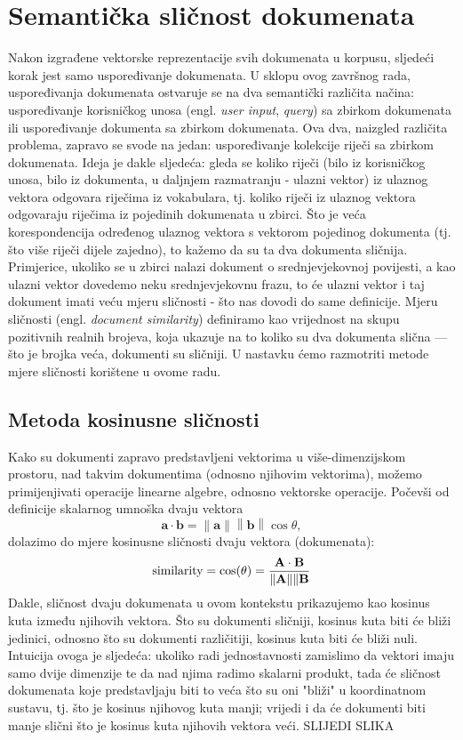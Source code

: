 \documentclass[times, utf8, zavrsni]{fer}
\begin{document}
\section{Semantička sličnost dokumenata}
Nakon izgrađene vektorske reprezentacije svih dokumenata u korpusu, sljedeći korak jest samo uspoređivanje dokumenata. U sklopu ovog završnog rada, uspoređivanja dokumenata ostvaruje se na dva semantički različita načina: uspoređivanje korisničkog unosa (engl. \textit{user input}, \textit{query}) sa zbirkom dokumenata ili uspoređivanje dokumenta sa zbirkom dokumenata.
Ova dva, naizgled različita problema, zapravo se svode na jedan: uspoređivanje kolekcije riječi sa zbirkom dokumenata. Ideja je dakle sljedeća: gleda se koliko riječi (bilo iz korisničkog unosa, bilo iz dokumenta, u daljnjem razmatranju - ulazni vektor) iz ulaznog vektora odgovara riječima iz vokabulara, tj. koliko riječi iz ulaznog vektora odgovaraju riječima iz pojedinih dokumenata u zbirci. Što je veća korespondencija određenog ulaznog vektora s vektorom pojedinog dokumenta (tj. što više riječi dijele zajedno), to kažemo da su ta dva dokumenta sličnija. Primjerice, ukoliko se u zbirci nalazi dokument o srednjevjekovnoj povijesti, a kao ulazni vektor dovedemo neku srednjevjekovnu frazu, to će ulazni vektor i taj dokument imati veću mjeru sličnosti - što nas dovodi do same definicije.
Mjeru sličnosti (engl. \textit{document similarity}) definiramo kao vrijednost na skupu pozitivnih realnih brojeva, koja ukazuje na to koliko su dva dokumenta slična — što je brojka veća, dokumenti su sličniji.
U nastavku ćemo razmotriti metode mjere sličnosti korištene u ovome radu.

\subsection{Metoda kosinusne sličnosti}
Kako su dokumenti zapravo predstavljeni vektorima u više-dimenzijskom prostoru, nad takvim dokumentima (odnosno njihovim vektorima), možemo primijenjivati operacije linearne algebre, odnosno vektorske operacije. Počevši od definicije skalarnog umnoška dvaju vektora
\begin{equation}
\mathbf {a} \cdot \mathbf {b} =\left\|\mathbf {a} \right\|\left\|\mathbf {b} \right\|\cos \theta,
\end{equation}
dolazimo do mjere kosinusne sličnosti dvaju vektora (dokumenata):
\begin{equation}
{\text{similarity}}=\cos(\theta )={\mathbf {A} \cdot \mathbf {B}  \over \|\mathbf {A} \|\|\mathbf {B}}
\end{equation}
Dakle, sličnost dvaju dokumenata u ovom kontekstu prikazujemo kao kosinus kuta između njihovih vektora. Što su dokumenti sličniji, kosinus kuta biti će bliži jedinici, odnosno što su dokumenti različitiji, kosinus kuta biti će bliži nuli. Intuicija ovoga je sljedeća: ukoliko radi jednostavnosti zamislimo da vektori imaju samo dvije dimenzije te da nad njima radimo skalarni produkt, tada će sličnost dokumenata koje predstavljaju biti to veća što su oni "bliži" u koordinatnom sustavu, tj. što je kosinus njihovog kuta manji; vrijedi i da će dokumenti biti manje slični što je kosinus kuta njihovih vektora veći. SLIJEDI SLIKA
\end{document}
